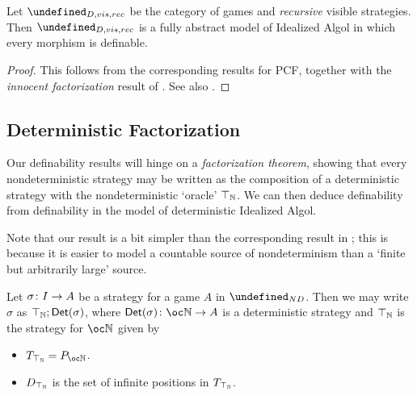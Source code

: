 \documentclass[sigplan,10pt,review]{acmart}\settopmatter{printfolios=true,printccs=false,printacmref=false}
\let\G\undefined
\begin{document}
\begin{proposition}
  Let $\G_{D,vis,rec}$ be the category of games and \emph{recursive} visible strategies.  
  Then $\G_{D,vis,rec}$ is a fully abstract model of Idealized Algol in which every morphism is definable.
\end{proposition}
\begin{proof}
  This follows from the corresponding results for PCF, together with the \emph{innocent factorization} result of \cite{SamsonGuyIAPassive}.  
  See also \cite{MurawskiUniversality}.
\end{proof}

\subsection{Deterministic Factorization}

Our definability results will hinge on a \emph{factorization theorem}, showing that every nondeterministic strategy may be written as the composition of a deterministic strategy with the nondeterministic `oracle' $\top_{\mathbb{N}}$.  
We can then deduce definability from definability in the model of deterministic Idealized Algol.

Note that our result is a bit simpler than the corresponding result in \cite{mcCHFiniteND}; this is because it is easier to model a countable source of nondeterminism than a `finite but arbitrarily large' source.

\begin{proposition}
  Let $\sigma\colon I \to A$ be a strategy for a game $A$ in $\G_{ND}$.
  Then we may write $\sigma$ as $\top_{\mathbb{N}};\mathsf{Det}(\sigma)$, where $\Det(\sigma)\from \oc\bN\to A$ is a deterministic strategy and $\top_{\mathbb{N}}$ is the strategy for $\oc\bN$ given by
  \begin{itemize}
    \item $T_{\top_{\bN}}=P_{\oc\bN}$.
    \item $D_{\top_{\mathbb{N}}}$ is the set of infinite positions in $T_{\top_{\mathbb{N}}}$.
  \end{itemize}
\end{proposition}
\end{document}
